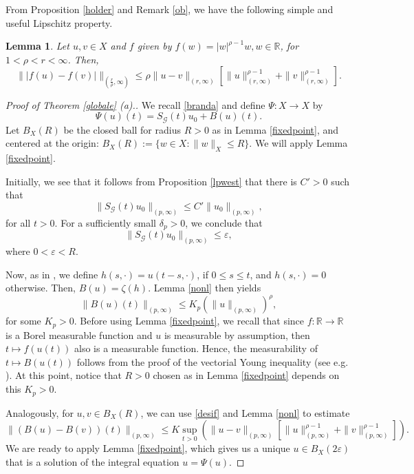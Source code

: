 \documentclass[12pt]{amsart}
\newtheorem{lemma}[theorem]{Lemma}
\newcommand{\R}{\mathbb{R}}
\begin{document}
From Proposition \ref{holder} and Remark \ref{ob}, we have the following simple and useful Lipschitz property.
\begin{lemma}
	Let $u,v \in X$ and $f$ given by $f(w)=|w|^{\rho-1}w, w\in\R$, for $1<\rho<r<\infty$. Then,
	\begin{equation}\label{desif}
		\||f(u)-f(v)|\|_{(\frac{r}{\rho},\infty)}\leq \rho\| u-v\|_{(r,\infty)}\left[\|u\|^{\rho-1}_{(r,\infty)}+\|v\|^{\rho-1}_{(r,\infty)}\right].
	\end{equation}
\end{lemma}


\begin{proof}[Proof of Theorem \ref{globale} (a).]
	We recall \eqref{branda} and define $\Psi: X \rightarrow X$ by $$\Psi(u)(t)=S_\mathcal{G}(t)u_0+B(u)(t) .$$ 
	Let $B_{X}(R)$ be the closed ball for radius $R>0$ as in Lemma \ref{fixedpoint}, and centered at the origin: $B_{X}(R):=\{w\in X:\|w\|_X\leq R\}$. We will apply Lemma \ref{fixedpoint}. 
	
	
	
	Initially, we see that it follows from Proposition \ref{lpwest} that there is $C'>0$ such that
	\begin{equation*}
		\|S_\mathcal{G}(t) u_0\|_{(p,\infty)}\leq C' \|u_0\|_{(p,\infty)} ,
	\end{equation*}
	for all $t>0$. For a sufficiently small $\delta_p>0$, we conclude that 
	\begin{equation}\label{desiB}
		\|S_\mathcal{G}(t) u_0\|_{(p,\infty)}\leq \varepsilon ,
	\end{equation}
	where $0<\varepsilon<R$. 
	
	Now, as in \cite{FVR}, we define $h(s,\cdot) = u(t-s,\cdot)$, if $0\leq s\leq t$, and $h(s,\cdot)=0$ otherwise. Then, $B(u)=\zeta(h)$. Lemma \ref{nonl} then yields
	\begin{equation}
		\|B(u)(t)\|_{(p,\infty)} \leq  K_p \left(\|u\|_{(p,\infty)}\right)^{\rho} ,
	\end{equation}
	for some $K_p>0$. Before using Lemma \eqref{fixedpoint}, we recall that since $f:\R\to\R$ is a Borel measurable function and $u$ is measurable by assumption, then $t\mapsto f(u(t))$ also is a measurable function. Hence, the measurability of $t\mapsto B(u(t))$ follows from the proof of the vectorial Young inequality (see e.g. \cite{Arendt-B-Hi-N-01}). At this point, notice that $R>0$ chosen as in Lemma \ref{fixedpoint} depends on this $K_p>0$. 
	

	Analogously, for $u, v \in B_{X}(R)$, we can use \eqref{desif} and Lemma \ref{nonl} to estimate
	\begin{equation}\label{psicont1}
		\|(B(u) - B(v))(t)\|_{(p,\infty)} \leq K \sup _{t>0} \left(\| u-v\|_{(p,\infty)} \left[\|u\|^{\rho-1}_{(p,\infty)}+\|v\|^{\rho-1}_{(p,\infty)}\right]\right).
	\end{equation}
	We are ready to apply Lemma \ref{fixedpoint}, which gives us a unique $u\in B_X(2\varepsilon)$ that is a solution of the integral equation $u=\Psi(u)$.
	

\end{proof}
\end{document}
